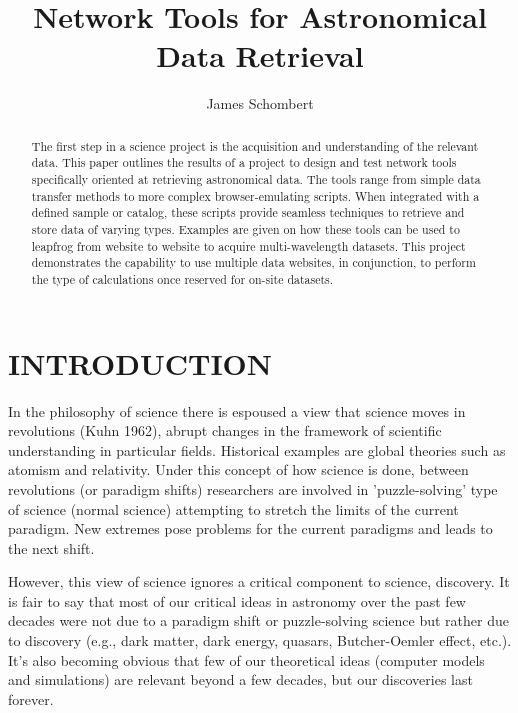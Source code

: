 \documentclass[11pt,preprint,graphicx]{aastex}
\begin{document}
\title{Network Tools for Astronomical Data Retrieval}

\author{James Schombert}

\begin{abstract}

The first step in a science project is the acquisition and understanding of
the relevant data.  This paper outlines the results of a project to design
and test network tools specifically oriented at retrieving astronomical
data.  The tools range from simple data transfer methods to more complex
browser-emulating scripts.  When integrated with a defined sample or
catalog, these scripts provide seamless techniques to retrieve and store
data of varying types.  Examples are given on how these tools can be used
to leapfrog from website to website to acquire multi-wavelength datasets.
This project demonstrates the capability to use multiple data websites, in
conjunction, to perform the type of calculations once reserved for on-site
datasets.

\end{abstract}


\section{INTRODUCTION}

\noindent In the philosophy of science there is espoused a view that
science moves in revolutions (Kuhn 1962), abrupt changes in the framework
of scientific understanding in particular fields.  Historical examples are
global theories such as atomism and relativity.  Under this concept of how
science is done, between revolutions (or paradigm shifts) researchers are
involved in 'puzzle-solving' type of science (normal science) attempting to
stretch the limits of the current paradigm.  New extremes pose problems
for the current paradigms and leads to the next shift.

\noindent However, this view of science ignores a critical component to
science, discovery.  It is fair to say that most of our critical ideas in
astronomy over the past few decades were not due to a paradigm shift or
puzzle-solving science but rather due to discovery (e.g., dark matter, dark
energy, quasars, Butcher-Oemler effect, etc.).   It's also becoming obvious
that few of our theoretical ideas (computer models and
simulations) are relevant beyond a few decades, but our discoveries last
forever.
\end{document}
